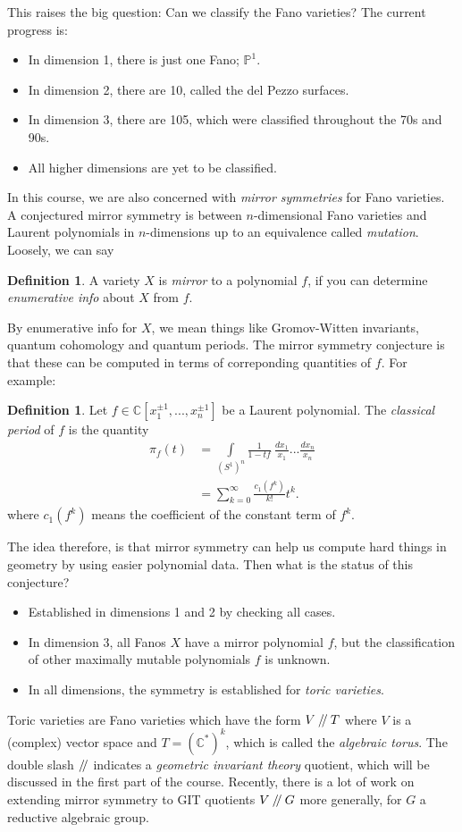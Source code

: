 \documentclass{article}
\theoremstyle{definition}
\newtheorem{definition}[theorem]{Definition}
\theoremstyle{remark}
\numberwithin{theorem}{section}
\newcommand{\C}{\mathbb{C}}
\newcommand{\bP}{\mathbb{P}}
\newcommand{\sslash}{\mathbin{/\mkern-4mu/}}
\newenvironment{defn}{
	\begin{mdframed}
		\vspace{-0.5em}
		\begin{definition}
		}{
		\end{definition}
	\end{mdframed}
}
\begin{document}
This raises the big question: Can we classify the Fano varieties? The current progress is:
\begin{itemize}
	\item In dimension 1, there is just one Fano; $\bP^1$.
	\item In dimension 2, there are 10, called the del Pezzo surfaces.
	\item In dimension 3, there are 105, which were classified throughout the 70s and 90s.
	\item All higher dimensions are yet to be classified.
\end{itemize}
In this course, we are also concerned with \emph{mirror symmetries} for Fano varieties. A conjectured mirror symmetry is between $n$-dimensional Fano varieties and Laurent polynomials in $n$-dimensions up to an equivalence called \emph{mutation}. Loosely, we can say
\begin{defn}
	A variety $X$ is \emph{mirror} to a polynomial $f$, if you can determine \emph{enumerative info} about $X$ from $f$.
\end{defn} 
By enumerative info for $X$, we mean things like Gromov-Witten invariants, quantum cohomology and quantum periods. The mirror symmetry conjecture is that these can be computed in terms of correponding quantities of $f$. For example:
\begin{defn}
	Let $f \in \C[x_1^{\pm 1},...,x_n^{\pm 1}]$ be a Laurent polynomial. The \emph{classical period} of $f$ is the quantity
	\begin{align*}
		\pi_f(t) &= \int\limits_{(S^1)^n} \frac{1}{1-tf} ~\frac{dx_1}{x_1}...\frac{dx_n}{x_n}\\
		&= \sum_{k=0}^\infty \frac{c_1(f^k)}{k!}t^k.
	\end{align*}
	where $c_1(f^k)$ means the coefficient of the constant term of $f^k$.
\end{defn}
The idea therefore, is that mirror symmetry can help us compute hard things in geometry by using easier polynomial data. Then what is the status of this conjecture?
\begin{itemize}
	\item Established in dimensions 1 and 2 by checking all cases.
	\item In dimension 3, all Fanos $X$ have a mirror polynomial $f$, but the classification of other maximally mutable polynomials $f$ is unknown.
	\item In all dimensions, the symmetry is established for \emph{toric varieties}.
\end{itemize}
Toric varieties are Fano varieties which have the form $V\sslash T$ where $V$ is a (complex) vector space and $T=(\C^\ast)^k$, which is called the \emph{algebraic torus}. The double slash $\sslash$ indicates a \emph{geometric invariant theory} quotient, which will be discussed in the first part of the course. Recently, there is a lot of work on extending mirror symmetry to GIT quotients $V\sslash G$ more generally, for $G$ a reductive algebraic group. \vspace{1em}
\end{document}
